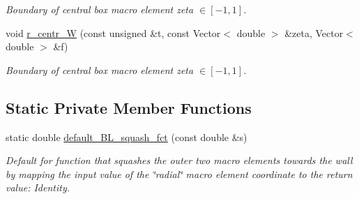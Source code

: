 \begin{DoxyCompactItemize}
\begin{DoxyCompactList}\small\item\em Boundary of central box macro element zeta $ \in [-1,1] $. \end{DoxyCompactList}\item 
void \hyperlink{classoomph_1_1QuarterCircleSectorDomain_a453fc6f043f57031c1347065d521a1c3}{r\+\_\+centr\+\_\+W} (const unsigned \&t, const Vector$<$ double $>$ \&zeta, Vector$<$ double $>$ \&f)
\begin{DoxyCompactList}\small\item\em Boundary of central box macro element zeta $ \in [-1,1] $. \end{DoxyCompactList}\end{DoxyCompactItemize}
\subsection*{Static Private Member Functions}
\begin{DoxyCompactItemize}
\item 
static double \hyperlink{classoomph_1_1QuarterCircleSectorDomain_adce1f0c6cf5405d6f8e9e6e0390d8c68}{default\+\_\+\+B\+L\+\_\+squash\+\_\+fct} (const double \&s)
\begin{DoxyCompactList}\small\item\em Default for function that squashes the outer two macro elements towards the wall by mapping the input value of the \char`\"{}radial\char`\"{} macro element coordinate to the return value\+: Identity. \end{DoxyCompactList}\end{DoxyCompactItemize}
